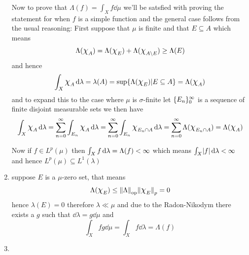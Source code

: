 \documentclass{article}
\begin{document}
\begin{homeworkProblem}
\begin{enumerate}[label=\alph*.]
        Now to prove that $\Lambda(f)=\int_X f\dd\mu$ we'll be satsfied with proving the statement for when $f$ is a simple function and the general case follows from the usual reasoning: First suppose that $\mu$ is finite and that $ E\subseteq A$ which means
        \[\Lambda(\Chi_A) = \Lambda(\Chi_E) + \Lambda(\Chi_{A\setminus E}) \geq \Lambda(E)\]
        and hence
        \[\int_X \Chi_A\dd\lambda = \lambda(A) = \sup\{\Lambda(\Chi_E)|E\subseteq A\} = \Lambda(\Chi_A)\]
        and to expand this to the case where $\mu$ is $\sigma$-finite let $\{E_n\}_0^\infty$ is a sequence of finite disjoint measurable sets we then have
        \[\int_X \Chi_A\dd\lambda = \sum_{n=0}^\i \int_{E_n}\Chi_A\dd\lambda = \sum_{n=0}^\i \int_{E_n}\Chi_{E_n\cap A}\dd\lambda = \sum_{n=0}^\i \Lambda(\Chi_{E_n\cap A}) = \Lambda(\Chi_A)\]

        Now if $f\in L^p(\mu)$ then $\int_X f \mathop{}\!\mathrm{d}\lambda=\Lambda(f)<\infty$ which means $\int_X \abs{f} \dd\lambda<\i$ and hence $L^p(\mu)\subseteq L^1(\lambda)$
        \item suppose $E$ is a $\mu$-zero set, that means
        \[\Lambda(\Chi_E) \leq \norm{\Lambda}_{\operatorname{op}}\norm{\Chi_E}_p = 0\]
        hence $\lambda(E) = 0$ therefore $\lambda\ll\mu$ and due to the Radon-Nikodym there exists a $g$ such that $\dd\lambda=g\dd\mu$ and 
        \[\int_X fg\dd\mu = \int_X f\dd\lambda = \Lambda(f)\]
        \item 
    \end{enumerate}
\end{homeworkProblem}
\end{document}
